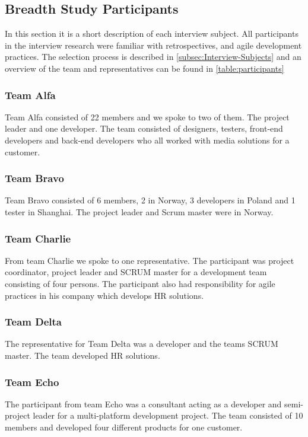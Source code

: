 \subsection{Breadth Study Participants}
In this section it is a short description of each interview subject. All participants in the interview research were familiar with retrospectives, and agile development practices. The selection process is described in \autoref{subsec:Interview-Subjects} and an overview of the team and representatives can be found in \autoref{table:participants}

\subsubsection{Team Alfa}
Team Alfa consisted of 22 members and we spoke to two of them. The project leader and one developer. The team consisted of designers, testers, front-end developers and back-end developers who all worked with media solutions for a customer. 

\subsubsection{Team Bravo}
Team Bravo consisted of 6 members, 2 in Norway, 3 developers in Poland and 1 tester in Shanghai. The project leader and Scrum master were in Norway. 

\subsubsection{Team Charlie}
From team Charlie we spoke to one representative. The participant was project coordinator, project leader and SCRUM master for a development team consisting of four persons. The participant also had responsibility for agile practices in his company which develops HR solutions. 

\subsubsection{Team Delta}
The representative for Team Delta was a developer and the teams SCRUM master. The team developed HR solutions. 

\subsubsection{Team Echo}
The participant from team Echo was a consultant acting as a developer and semi-project leader for a multi-platform development project. The team consisted of 10 members and developed four different products for one customer.

